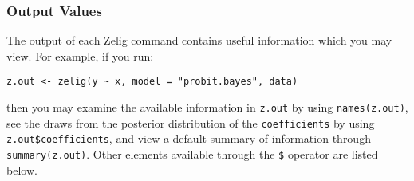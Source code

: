 \subsubsection{Output Values}

The output of each Zelig command contains useful information which you may
view. For example, if you run:
\begin{verbatim}
z.out <- zelig(y ~ x, model = "probit.bayes", data)
\end{verbatim}

\noindent then you may examine the available information in \texttt{z.out} by
using \texttt{names(z.out)}, see the draws from the posterior distribution of
the \texttt{coefficients} by using \texttt{z.out\$coefficients}, and view 
a default summary of information through \texttt{summary(z.out)}. 
Other elements available through the \texttt{\$} operator are listed below.

